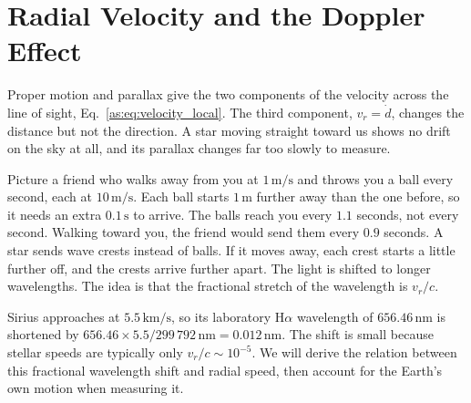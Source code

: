 \section{Radial Velocity and the Doppler Effect}
\label{as:sec:doppler}

Proper motion and parallax give the two components of the velocity across the line of sight, Eq.~\eqref{as:eq:velocity_local}. The third component, $v_r=\dot d$, changes the distance but not the direction. A star moving straight toward us shows no drift on the sky at all, and its parallax changes far too slowly to measure.

Picture a friend who walks away from you at $1\,\mathrm{m/s}$ and throws you a ball every second, each at $10\,\mathrm{m/s}$. Each ball starts $1\,\mathrm m$ further away than the one before, so it needs an extra $0.1\,\mathrm s$ to arrive. The balls reach you every $1.1$ seconds, not every second. Walking toward you, the friend would send them every $0.9$ seconds. A star sends wave crests instead of balls. If it moves away, each crest starts a little further off, and the crests arrive further apart. The light is shifted to longer wavelengths. The idea is that the fractional stretch of the wavelength is $v_r/c$.

Sirius approaches at $5.5\,\mathrm{km/s}$, so its laboratory $\mathrm H\alpha$ wavelength of $656.46\,\mathrm{nm}$ is shortened by $656.46\times5.5/299\,792\,\mathrm{nm}=0.012\,\mathrm{nm}$. The shift is small because stellar speeds are typically only $v_r/c\sim10^{-5}$. We will derive the relation between this fractional wavelength shift and radial speed, then account for the Earth's own motion when measuring it.

